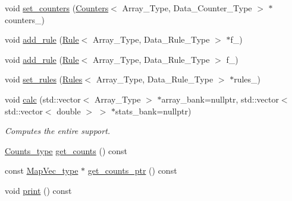 \begin{DoxyCompactItemize}
\item 
void \hyperlink{classbarry_1_1_support_aef83474cda55c4ed52e313e8ed948b08}{set\+\_\+counters} (\hyperlink{classbarry_1_1_counters}{Counters}$<$ Array\+\_\+\+Type, Data\+\_\+\+Counter\+\_\+\+Type $>$ $\ast$counters\+\_\+)
\item 
void \hyperlink{classbarry_1_1_support_a3113a4586c541aa25db7b4a864b748a2}{add\+\_\+rule} (\hyperlink{classbarry_1_1_rule}{Rule}$<$ Array\+\_\+\+Type, Data\+\_\+\+Rule\+\_\+\+Type $>$ $\ast$f\+\_\+)
\item 
void \hyperlink{classbarry_1_1_support_aa817cb5d6c48dda3ecfeef2c5897b537}{add\+\_\+rule} (\hyperlink{classbarry_1_1_rule}{Rule}$<$ Array\+\_\+\+Type, Data\+\_\+\+Rule\+\_\+\+Type $>$ f\+\_\+)
\item 
void \hyperlink{classbarry_1_1_support_a66dc1a0e7097d547ea9c84df777ad477}{set\+\_\+rules} (\hyperlink{classbarry_1_1_rules}{Rules}$<$ Array\+\_\+\+Type, Data\+\_\+\+Rule\+\_\+\+Type $>$ $\ast$rules\+\_\+)
\item 
void \hyperlink{classbarry_1_1_support_afa36b8c1348e28c51296379157f58081}{calc} (std\+::vector$<$ Array\+\_\+\+Type $>$ $\ast$array\+\_\+bank=nullptr, std\+::vector$<$ std\+::vector$<$ double $>$ $>$ $\ast$stats\+\_\+bank=nullptr)
\begin{DoxyCompactList}\small\item\em Computes the entire support. \end{DoxyCompactList}\item 
\hyperlink{namespacebarry_a3e2d8c3b6cf602107559d4237d9f1315}{Counts\+\_\+type} \hyperlink{classbarry_1_1_support_a5d93a94eaed9b1157fb934284883fd47}{get\+\_\+counts} () const
\item 
const \hyperlink{namespacebarry_a2f0d3aab1d67e4c8eaeab9022e16139f}{Map\+Vec\+\_\+type} $\ast$ \hyperlink{classbarry_1_1_support_abcb4dea3c5a1b140990821900432f90e}{get\+\_\+counts\+\_\+ptr} () const
\item 
void \hyperlink{classbarry_1_1_support_af87b2e85ec72e394387946023508e7fd}{print} () const
\end{DoxyCompactItemize}
